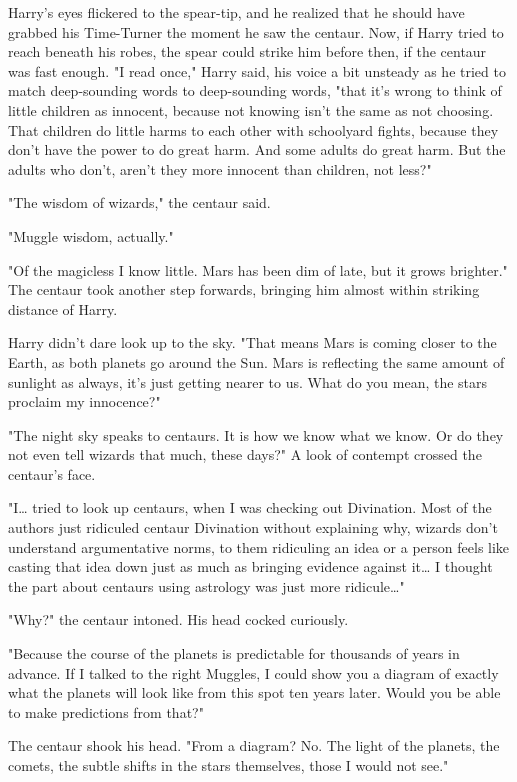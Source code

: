 Harry's eyes flickered to the spear-tip, and he realized that he should have
grabbed his Time-Turner the moment he saw the centaur. Now, if Harry tried to
reach beneath his robes, the spear could strike him before then, if the centaur
was fast enough. "I read once," Harry said, his voice a bit unsteady as he
tried to match deep-sounding words to deep-sounding words, "that it's wrong to
think of little children as innocent, because not knowing isn't the same as not
choosing. That children do little harms to each other with schoolyard fights,
because they don't have the power to do great harm. And some adults do great
harm. But the adults who don't, aren't they more innocent than children, not
less?"

"The wisdom of wizards," the centaur said.

"Muggle wisdom, actually."

"Of the magicless I know little. Mars has been dim of late, but it grows
brighter." The centaur took another step forwards, bringing him almost within
striking distance of Harry.

Harry didn't dare look up to the sky. "That means Mars is coming closer to the
Earth, as both planets go around the Sun. Mars is reflecting the same amount of
sunlight as always, it's just getting nearer to us. What do you mean, the stars
proclaim my innocence?"

"The night sky speaks to centaurs. It is how we know what we know. Or do they
not even tell wizards that much, these days?" A look of contempt crossed the
centaur's face.

"I{\ldots} tried to look up centaurs, when I was checking out Divination. Most
of the authors just ridiculed centaur Divination without explaining why,
wizards don't understand argumentative norms, to them ridiculing an idea or a
person feels like casting that idea down just as much as bringing evidence
against it{\ldots} I thought the part about centaurs using astrology was just
more ridicule{\ldots}"

"Why?" the centaur intoned. His head cocked curiously.

"Because the course of the planets is predictable for thousands of years in
advance. If I talked to the right Muggles, I could show you a diagram of
exactly what the planets will look like from this spot ten years later. Would
you be able to make predictions from that?"

The centaur shook his head. "From a diagram? No. The light of the planets, the
comets, the subtle shifts in the stars themselves, those I would not see."


